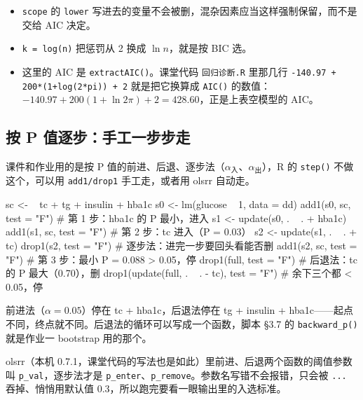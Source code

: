 \begin{itemize}
\item \Verb|scope| 的 \Verb|lower| 写进去的变量不会被删，混杂因素应当这样强制保留，而不是交给 AIC 决定。
\item \Verb|k = log(n)| 把惩罚从 2 换成 $\ln n$，就是按 BIC 选。
\item 这里的 AIC 是 \Verb|extractAIC()|。课堂代码 \Verb|回归诊断.R| 里那几行 \Verb|-140.97 + 200*(1+log(2*pi)) + 2| 就是把它换算成 \Verb|AIC()| 的数值：$-140.97+200(1+\ln2\pi)+2=428.60$，正是上表空模型的 AIC。
\end{itemize}

\subsection{按 P 值逐步：手工一步步走}
课件和作业用的是按 P 值的前进、后退、逐步法（$\alpha_{\text{入}}$、$\alpha_{\text{出}}$），R 的 \Verb|step()| 不做这个，可以用 \Verb|add1/drop1| 手工走，或者用 olsrr 自动走。

\begin{RCode}
sc <- ~ tc + tg + insulin + hba1c
s0 <- lm(glucose ~ 1, data = dd)
add1(s0, sc, test = "F")                    # 第 1 步：hba1c 的 P 最小，进入
s1 <- update(s0, . ~ . + hba1c)
add1(s1, sc, test = "F")                    # 第 2 步：tc 进入（P = 0.03）
s2 <- update(s1, . ~ . + tc)
drop1(s2, test = "F")                       # 逐步法：进完一步要回头看能否删
add1(s2, sc, test = "F")                    # 第 3 步：最小 P = 0.088 > 0.05，停
drop1(full, test = "F")                     # 后退法：tc 的 P 最大（0.70），删
drop1(update(full, . ~ . - tc), test = "F") # 余下三个都 < 0.05，停
\end{RCode}
前进法（$\alpha=0.05$）停在 tc + hba1c，后退法停在 tg + insulin + hba1c——起点不同，终点就不同。后退法的循环可以写成一个函数，脚本 §3.7 的 \Verb|backward_p()| 就是作业一 bootstrap 用的那个。

olsrr（本机 0.7.1，课堂代码的写法也是如此）里前进、后退两个函数的阈值参数叫 \Verb|p_val|，逐步法才是 \Verb|p_enter|、\Verb|p_remove|。参数名写错不会报错，只会被 \Verb|...| 吞掉、悄悄用默认值 0.3，所以跑完要看一眼输出里的入选标准。

